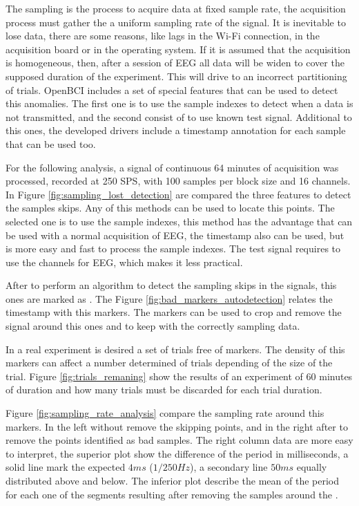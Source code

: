 The sampling is the process to acquire data at fixed sample rate, the acquisition process must gather the a uniform sampling rate of the signal. It is inevitable to lose data, there are some reasons, like lags in the Wi-Fi connection, in the acquisition board or in the operating system. If it is assumed that the acquisition is homogeneous, then, after a session of EEG all data will be widen to cover the supposed duration of the experiment. This will drive to an incorrect partitioning of trials. OpenBCI includes a set of special features that can be used to detect this anomalies. The first one is to use the sample indexes to detect when a data is not transmitted, and the second consist of to use known test signal. Additional to this ones, the developed drivers include a timestamp annotation for each sample that can be used too.



For the following analysis, a signal of continuous 64 minutes of acquisition was processed, recorded at 250 SPS, with 100 samples per block size and 16 channels. In Figure \ref{fig:sampling_lost_detection} are compared the three features to detect the samples skips. Any of this methods can be used to locate this points. The selected one is to use the sample indexes, this method has the advantage that can be used with a normal acquisition of EEG, the timestamp also can be used, but is more easy and fast to process the sample indexes. The test signal requires to use the channels for EEG, which makes it less practical.



After to perform an algorithm to detect the sampling skips in the signals, this ones are marked as . The Figure \ref{fig:bad_markers_autodetection} relates the timestamp with this markers. The  markers can be used to crop and remove the signal around this ones and to keep with the correctly sampling data. 



In a real experiment is desired a set of trials free of  markers. The density of this markers can affect a number determined of trials depending of the size of the trial. Figure \ref{fig:trials_remaning} show the results of an experiment of 60 minutes of duration and how many trials must be discarded for each trial duration.

Figure \ref{fig:sampling_rate_analysis} compare the sampling rate around this markers. In the left without remove the skipping points, and in the right after to remove the points identified as bad samples. The right column data are more easy to interpret, the superior plot show the difference of the period in milliseconds, a solid line mark the expected $4 ms$ ($1/250 Hz$), a secondary line $50 ms$ equally distributed above and below. The inferior plot describe the mean of the period for each one of the segments resulting after removing the samples around the .

